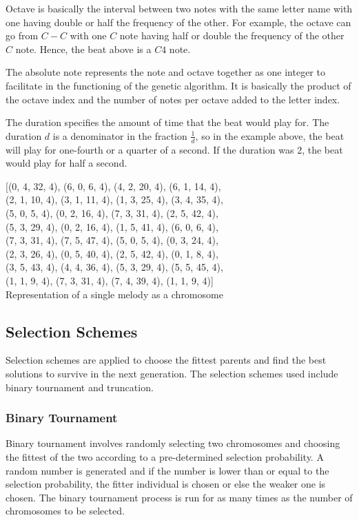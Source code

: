 \documentclass[conference]{IEEEtran}
\begin{document}
Octave is basically the interval between two notes with the same letter name with one having double or half the frequency of the other. For example, the octave can go from $C-C$ with one $C$ note having half or double the frequency of the other $C$ note. Hence, the beat above is a $C4$ note.

The absolute note represents the note and octave together as one integer to facilitate in the functioning of the genetic algorithm. It is basically the product of the octave index and the number of notes per octave added to the letter index.

The duration specifies the amount of time that the beat would play for. The duration $d$ is a denominator in the fraction $\frac{1}{d}$, so in the example above, the beat will play for one-fourth or a quarter of a second. If the duration was 2, the beat would play for half a second.

\begin{center}
    [(0, 4, 32, 4), (6, 0, 6, 4), (4, 2, 20, 4), (6, 1, 14, 4),\\ (2, 1, 10, 4), (3, 1, 11, 4), (1, 3, 25, 4), (3, 4, 35, 4),\\ (5, 0, 5, 4), (0, 2, 16, 4), (7, 3, 31, 4), (2, 5, 42, 4),\\ (5, 3, 29, 4), (0, 2, 16, 4), (1, 5, 41, 4), (6, 0, 6, 4),\\ (7, 3, 31, 4), (7, 5, 47, 4), (5, 0, 5, 4), (0, 3, 24, 4),\\ (2, 3, 26, 4), (0, 5, 40, 4), (2, 5, 42, 4), (0, 1, 8, 4),\\ (3, 5, 43, 4), (4, 4, 36, 4), (5, 3, 29, 4), (5, 5, 45, 4),\\ (1, 1, 9, 4), (7, 3, 31, 4), (7, 4, 39, 4), (1, 1, 9, 4)]\\
    
    Representation of a single melody as a chromosome
\end{center}

\subsection{Selection Schemes}
Selection schemes are applied to choose the fittest parents and find the best solutions to survive in the next generation. The selection schemes used include binary tournament and truncation.

\subsubsection{Binary Tournament}
Binary tournament involves randomly selecting two chromosomes and choosing the fittest of the two according to a pre-determined selection probability. A random number is generated and if the number is lower than or equal to the selection probability, the fitter individual is chosen or else the weaker one is chosen. The binary tournament process is run for as many times as the number of chromosomes to be selected.
\end{document}
